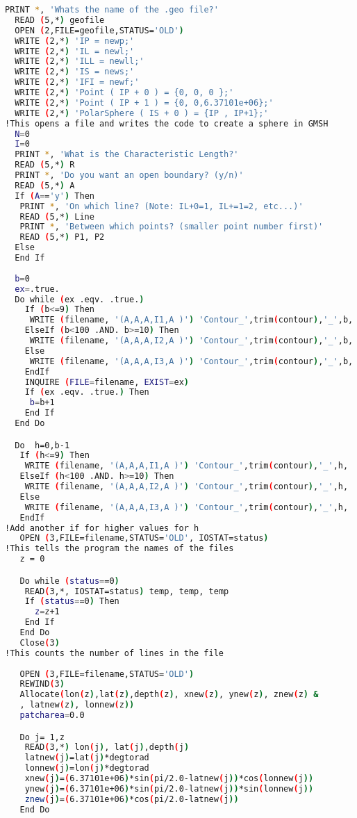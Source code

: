 \begin{lstlisting}[language = Bash]
  PRINT *, 'Whats the name of the .geo file?'
  READ (5,*) geofile
  OPEN (2,FILE=geofile,STATUS='OLD')
  WRITE (2,*) 'IP = newp;'
  WRITE (2,*) 'IL = newl;'
  WRITE (2,*) 'ILL = newll;'
  WRITE (2,*) 'IS = news;'
  WRITE (2,*) 'IFI = newf;'
  WRITE (2,*) 'Point ( IP + 0 ) = {0, 0, 0 };'
  WRITE (2,*) 'Point ( IP + 1 ) = {0, 0,6.37101e+06};'
  WRITE (2,*) 'PolarSphere ( IS + 0 ) = {IP , IP+1};'
!This opens a file and writes the code to create a sphere in GMSH
  N=0
  I=0
  PRINT *, 'What is the Characteristic Length?'
  READ (5,*) R
  PRINT *, 'Do you want an open boundary? (y/n)'
  READ (5,*) A
  If (A=='y') Then
   PRINT *, 'On which line? (Note: IL+0=1, IL+=1=2, etc...)'
   READ (5,*) Line
   PRINT *, 'Between which points? (smaller point number first)'
   READ (5,*) P1, P2
  Else
  End If
  
  b=0
  ex=.true.
  Do while (ex .eqv. .true.)
    If (b<=9) Then
     WRITE (filename, '(A,A,A,I1,A )') 'Contour_',trim(contour),'_',b, '_i.xyz'
    ElseIf (b<100 .AND. b>=10) Then
     WRITE (filename, '(A,A,A,I2,A )') 'Contour_',trim(contour),'_',b, '_i.xyz'
    Else 
     WRITE (filename, '(A,A,A,I3,A )') 'Contour_',trim(contour),'_',b, '_i.xyz'
    EndIf
    INQUIRE (FILE=filename, EXIST=ex)   
    If (ex .eqv. .true.) Then
     b=b+1
    End If
  End Do

  Do  h=0,b-1
   If (h<=9) Then
    WRITE (filename, '(A,A,A,I1,A )') 'Contour_',trim(contour),'_',h, '_i.xyz'
   ElseIf (h<100 .AND. h>=10) Then
    WRITE (filename, '(A,A,A,I2,A )') 'Contour_',trim(contour),'_',h, '_i.xyz'
   Else 
    WRITE (filename, '(A,A,A,I3,A )') 'Contour_',trim(contour),'_',h, '_i.xyz'
   EndIf
!Add another if for higher values for h
   OPEN (3,FILE=filename,STATUS='OLD', IOSTAT=status)
!This tells the program the names of the files
   z = 0

   Do while (status==0)
    READ(3,*, IOSTAT=status) temp, temp, temp
    If (status==0) Then
      z=z+1
    End If
   End Do   
   Close(3)
!This counts the number of lines in the file
   
   OPEN (3,FILE=filename,STATUS='OLD')
   REWIND(3)
   Allocate(lon(z),lat(z),depth(z), xnew(z), ynew(z), znew(z) &
   , latnew(z), lonnew(z))
   patcharea=0.0

   Do j= 1,z
    READ(3,*) lon(j), lat(j),depth(j)
    latnew(j)=lat(j)*degtorad
    lonnew(j)=lon(j)*degtorad
    xnew(j)=(6.37101e+06)*sin(pi/2.0-latnew(j))*cos(lonnew(j))
    ynew(j)=(6.37101e+06)*sin(pi/2.0-latnew(j))*sin(lonnew(j))
    znew(j)=(6.37101e+06)*cos(pi/2.0-latnew(j))     
   End Do


\end{lstlisting}
